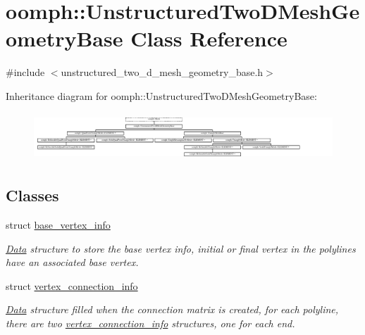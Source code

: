\hypertarget{classoomph_1_1UnstructuredTwoDMeshGeometryBase}{}\section{oomph\+:\+:Unstructured\+Two\+D\+Mesh\+Geometry\+Base Class Reference}
\label{classoomph_1_1UnstructuredTwoDMeshGeometryBase}


{\ttfamily \#include $<$unstructured\+\_\+two\+\_\+d\+\_\+mesh\+\_\+geometry\+\_\+base.\+h$>$}

Inheritance diagram for oomph\+:\+:Unstructured\+Two\+D\+Mesh\+Geometry\+Base\+:\begin{figure}[H]
\begin{center}
\leavevmode
\includegraphics[height=1.816216cm]{classoomph_1_1UnstructuredTwoDMeshGeometryBase}
\end{center}
\end{figure}
\subsection*{Classes}
\begin{DoxyCompactItemize}
\item 
struct \hyperlink{structoomph_1_1UnstructuredTwoDMeshGeometryBase_1_1base__vertex__info}{base\+\_\+vertex\+\_\+info}
\begin{DoxyCompactList}\small\item\em \hyperlink{classoomph_1_1Data}{Data} structure to store the base vertex info, initial or final vertex in the polylines have an associated base vertex. \end{DoxyCompactList}\item 
struct \hyperlink{structoomph_1_1UnstructuredTwoDMeshGeometryBase_1_1vertex__connection__info}{vertex\+\_\+connection\+\_\+info}
\begin{DoxyCompactList}\small\item\em \hyperlink{classoomph_1_1Data}{Data} structure filled when the connection matrix is created, for each polyline, there are two \hyperlink{structoomph_1_1UnstructuredTwoDMeshGeometryBase_1_1vertex__connection__info}{vertex\+\_\+connection\+\_\+info} structures, one for each end. \end{DoxyCompactList}\end{DoxyCompactItemize}
